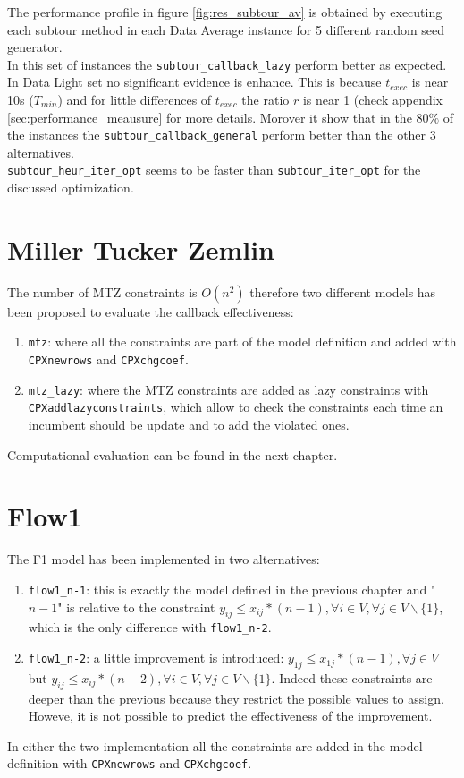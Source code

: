 The performance profile in figure \ref{fig:res_subtour_av} is obtained by executing each subtour method in each Data Average instance for 5 different random seed generator. \\
In this set of instances the \texttt{subtour\_callback\_lazy} perform better as expected. In Data Light set no significant evidence is enhance. This is because $ t_{exec} $ is near 10s ($ T_{min} $) and for little differences of $ t_{exec} $ the ratio $ r $ is near 1 (check appendix \ref{sec:performance_meausure} for more details.
Morover it show that in the $ 80\%  $  of the instances the \texttt{subtour\_callback\_general} perform better than the other 3 alternatives.\\
\texttt{subtour\_heur\_iter\_opt} seems to be faster than \texttt{subtour\_iter\_opt} for the discussed optimization. 


\section{Miller Tucker Zemlin}
The number of MTZ constraints is $O(n^2)$ therefore two different models has been proposed to evaluate the callback effectiveness:
\begin{enumerate}
	\item \texttt{mtz}: where all the constraints are part of the model definition and added with \texttt{CPXnewrows} and \texttt{CPXchgcoef}. 
	\item \texttt{mtz\_lazy}: where the MTZ constraints are added as lazy constraints with \texttt{CPXaddlazyconstraints}, which allow to check the constraints each time an incumbent should be update and to add the violated ones.
\end{enumerate}

Computational evaluation can be found in the next chapter.

\section{Flow1}
The F1 model has been implemented in two alternatives:
\begin{enumerate}
	\item \texttt{flow1\_n-1}: this is exactly the model defined in the previous chapter and "$ n-1 $" is relative to the constraint  $ y_{ij} \leq x_{ij} \ast (n-1), \forall i \in V, \forall j \in V \backslash \{1\} $, which is the only difference with \texttt{flow1\_n-2}. 
	\item \texttt{flow1\_n-2}: a little improvement is introduced: $ y_{1j} \leq x_{1j} \ast (n-1), \forall j \in V $ but $ y_{ij} \leq x_{ij} \ast (n-2), \forall i \in V, \forall j \in V \backslash \{1\} $. Indeed these constraints are deeper than the previous because they restrict the possible values to assign. Howeve, it is not possible to predict the effectiveness of the improvement.
\end{enumerate}
In either the two implementation all the constraints are added in the model definition with \texttt{CPXnewrows} and \texttt{CPXchgcoef}.

